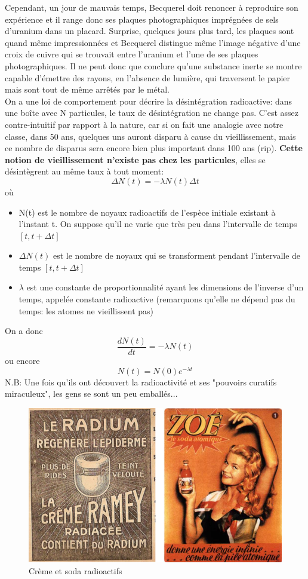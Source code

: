 Cependant, un jour de mauvais temps, Becquerel doit renoncer à reproduire son expérience et il range donc ses plaques photographiques imprégnées de sels d'uranium dans un placard. Surprise, quelques jours plus tard, les plaques sont quand même impressionnées et Becquerel distingue même l'image négative d'une croix de cuivre qui se trouvait entre l'uranium et l'une de ses plaques photographiques. Il ne peut donc que conclure qu'une substance inerte se montre capable d'émettre des rayons, en l'absence de lumière, qui traversent le papier mais sont tout de même arrêtés par le métal. \\

On a une loi de comportement pour décrire la désintégration radioactive: dans une boîte avec N particules, le taux de désintégration ne change pas. C'est assez contre-intuitif par rapport à la nature, car si on fait une analogie avec notre classe, dans 50 ans, quelques uns auront disparu à cause du vieillissement, mais ce nombre de disparus sera encore bien plus important dans 100 ans (rip). \textbf{Cette notion de vieillissement n'existe pas chez les particules}, elles se désintègrent au même taux à tout moment:
\[    \Delta N(t)=-\lambda N(t) \Delta t    \]
où
\begin{itemize}
    \item N(t) est le nombre de noyaux radioactifs de l'espèce initiale existant à l'instant t. On suppose qu'il ne varie que très peu dans l'intervalle de temps $[t,t+\Delta t]$
    \item $\Delta N(t)$ est le nombre de noyaux qui se transforment pendant l'intervalle de temps $[t,t+\Delta t]$
    \item $\lambda$ est une constante de proportionnalité ayant les dimensions de l'inverse d'un temps, appelée constante radioactive (remarquons qu'elle ne dépend pas du temps: les atomes ne vieillissent pas)
\end{itemize}
On a donc
\[
    \dfrac{dN(t)}{dt}=-\lambda N(t)
\]
ou encore
\[
    N(t)=N(0)e^{-\lambda t}
\]
N.B: Une fois qu'ils ont découvert la radioactivité et ses "pouvoirs curatifs miraculeux", les gens se sont un peu emballés...

\begin{figure}[H]
    \centering
    \includegraphics[scale=0.60]{Images1/produits.png}
    \caption{Crème et soda radioactifs}
\end{figure}

